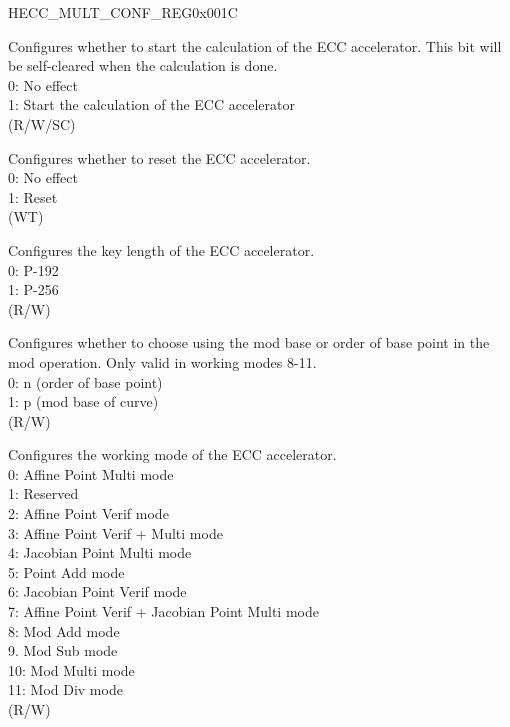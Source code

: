 \begin{register}{H}{ECC\_MULT\_CONF\_REG}{0x001C}\label{regdesc:ECCMULTCONFREG}
%
%
%
%
%
%
%
%
%
%
\regnewline%
\begin{regdesc}\begin{reglist}
\label{fielddesc:ECCMULTSTART}\item [ECC\_MULT\_START] Configures whether to start the calculation of the ECC accelerator. This bit will be self-cleared when the calculation is done. \\
0: No effect\\
1: Start the calculation of the ECC accelerator\\
(R/W/SC)
\label{fielddesc:ECCMULTRESET}\item [ECC\_MULT\_RESET] Configures whether to reset the ECC accelerator. \\
0: No effect\\
1: Reset\\
(WT)
\label{fielddesc:ECCMULTKEYLENGTH}\item [ECC\_MULT\_KEY\_LENGTH] Configures the key length of the ECC accelerator. \\
0: P-192\\
1: P-256\\
(R/W)
\label{fielddesc:ECCMULTMODBASE}\item [ECC\_MULT\_MOD\_BASE] Configures whether to choose using the mod base or order of base point in the mod operation. Only valid in working modes 8-11. \\
0: n (order of base point)\\
1: p (mod base of curve)\\
(R/W)
\label{fielddesc:ECCMULTWORKMODE}\item [ECC\_MULT\_WORK\_MODE] Configures the working mode of the ECC accelerator.\\
0: Affine Point Multi mode\\
1: Reserved\\
2: Affine Point Verif mode\\
3: Affine Point Verif + Multi mode\\
4: Jacobian Point Multi mode\\
5: Point Add mode\\
6: Jacobian Point Verif mode\\
7: Affine Point Verif + Jacobian Point Multi mode\\
8: Mod Add mode\\
9. Mod Sub mode\\
10: Mod Multi mode\\
11: Mod Div mode\\
(R/W)


\end{reglist}
\end{regdesc}
\end{register}
